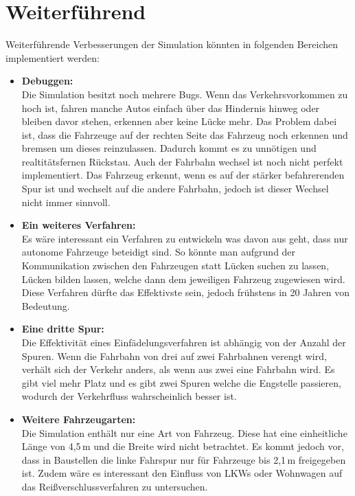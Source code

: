 \chapter{Weiterführend}
Weiterführende Verbesserungen der Simulation könnten in folgenden Bereichen implementiert werden:
\begin{itemize}
	\item \textbf{Debuggen:}\\
	Die Simulation besitzt noch mehrere Bugs. Wenn das Verkehrsvorkommen zu hoch ist, fahren manche Autos einfach über das Hindernis hinweg oder bleiben davor stehen, erkennen aber keine Lücke mehr. Das Problem dabei ist, dass die Fahrzeuge auf der rechten Seite das Fahrzeug noch erkennen und bremsen um dieses reinzulassen. Dadurch kommt es zu unnötigen und realtitätsfernen Rückstau.
	Auch der Fahrbahn wechsel ist noch nicht perfekt implementiert. Das Fahrzeug erkennt, wenn es auf der stärker befahrerenden Spur ist und wechselt auf die andere Fahrbahn, jedoch ist dieser Wechsel nicht immer sinnvoll.
	\item \textbf{Ein weiteres Verfahren:}\\
	Es wäre interessant ein Verfahren zu entwickeln was davon aus geht, dass nur autonome Fahrzeuge beteidigt sind. So könnte man aufgrund der Kommunikation zwischen den Fahrzeugen statt Lücken suchen zu lassen, Lücken bilden lassen, welche dann dem jeweiligen Fahrzeug zugewiesen wird. Diese Verfahren dürfte das Effektivste sein, jedoch frühstens in 20 Jahren von Bedeutung.
	
	\item \textbf{Eine dritte Spur:}\\
	Die Effektivität eines Einfädelungsverfahren ist abhängig von der Anzahl der Spuren. Wenn die Fahrbahn von drei auf zwei Fahrbahnen verengt wird, verhält sich der Verkehr anders, als wenn aus zwei eine Fahrbahn wird. Es gibt viel mehr Platz und es gibt zwei Spuren welche die Engstelle passieren, wodurch der Verkehrfluss wahrscheinlich besser ist.
	
	\item \textbf{Weitere Fahrzeugarten:}\\
	Die Simulation enthält nur eine Art von Fahrzeug. Diese hat eine einheitliche Länge von 4,5\,m und die Breite wird nicht betrachtet. Es kommt jedoch vor, dass in Baustellen die linke Fahrspur nur für Fahrzeuge bis 2,1\,m freigegeben ist.
	Zudem wäre es interessant den Einfluss von LKWs oder Wohnwagen auf das Reißverschlussverfahren zu untersuchen.
	

\end{itemize}
